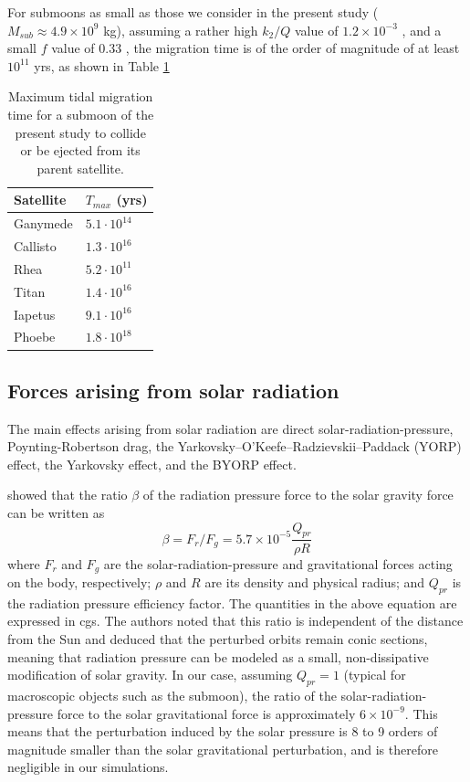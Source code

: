 \documentclass{aa}
\begin{document}
\begin{appendix}
For submoons as small as those we consider in the present study ($M_{sub}\approx4.9\times 10^9$ kg), assuming a rather high $k_2/Q$ value of $1.2\times10^{-3}$ \citep{Rosario-Franco_2020}, and a small $f$ value of 0.33 \citep{Rosario-Franco_2020}, the migration time is of the order of magnitude of at least $10^{11}$ yrs, as shown in Table \ref{tab:temps_marees}

\begin{table}[!ht]
    \centering
    \caption{Maximum tidal migration time for a submoon of the present study to collide or be ejected from its parent satellite.}
    \begin{tabular}{ll}
    \hline
        Satellite & $T_{max}$ (yrs) \\ \hline
        Ganymede & $5.1\cdot10^{14}$ \\ 
        Callisto & $1.3\cdot10^{16}$ \\ 
        Rhea & $5.2\cdot10^{11}$ \\ 
        Titan  & $1.4\cdot10^{16}$ \\ 
        Iapetus & $9.1\cdot10^{16}$ \\ 
        Phoebe & $1.8\cdot10^{18}$ \\ \hline
    \end{tabular}
    \label{tab:temps_marees}
\end{table}

\subsection{Forces arising from solar radiation}
The main effects arising from solar radiation are direct solar-radiation-pressure, Poynting-Robertson drag, the Yarkovsky–O'Keefe–Radzievskii–Paddack (YORP) effect, the Yarkovsky effect, and the BYORP effect.

\cite{BURNS1979} showed that the ratio $\beta$ of the radiation pressure force to the solar gravity force can be written as 
\begin{equation}
    \beta = F_r/F_g = 5.7\times10^{-5}\frac{Q_{pr}}{\rho R}
\end{equation}
where $F_r$ and $F_g$ are the solar-radiation-pressure and gravitational forces acting on the body, respectively; $\rho$ and $R$ are its density and physical radius; and $Q_{pr}$ is the radiation pressure efficiency factor. The quantities in the above equation are expressed in cgs.
The authors noted that this ratio is independent of the distance from the Sun and deduced that the perturbed orbits remain conic sections, meaning that radiation pressure can be modeled as a small, non-dissipative modification of solar gravity. In our case, assuming $Q_{pr}=1$ (typical for macroscopic objects such as the submoon), the ratio of the solar-radiation-pressure force to the solar gravitational force is approximately $6\times10^{-9}$. This means that the perturbation induced by the solar pressure is 8 to 9 orders of magnitude smaller than the solar gravitational perturbation, and is therefore negligible in our simulations.


\end{appendix}
\end{document}
